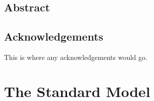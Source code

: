 \documentclass[oneside, letterpaper, 12pt, oldfontcommands]{memoir}
\begin{document}
\modulolinenumbers[1]
\linenumbers
\frontmatter


\thetitlepage
\clearpage

\thecopyrightpage
\cleardoublepage

\setcounter{page}{1}

\section{Abstract}
\uwabstract
\cleardoublepage

\section{Acknowledgements}
This is where any acknowledgements would go.
\clearpage

\tableofcontents* %
 \listoffigures*  %
 \listoftables   %

\mainmatter

\chapter{The Standard Model}


\end{document}
